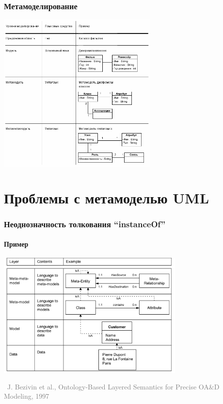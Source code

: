 \documentclass[xetex,mathserif,serif]{beamer}
\newcommand{\attribution}[1] {
\vspace{-5mm}\begin{flushright}\begin{scriptsize}\textcolor{gray}{\textcopyright\, #1}\end{scriptsize}\end{flushright}
}
\begin{document}
	\begin{frame}
		\frametitle{Метамоделирование}
		\begin{center}
			\includegraphics[width=0.6\textwidth]{metalevels.png}
		\end{center}
	\end{frame}

	\section{Проблемы с метамоделью UML}

	\begin{frame}
		\frametitle{Неоднозначность толкования ``instanceOf''}
		\framesubtitle{Пример}
		\begin{center}
			\includegraphics[width=0.7\textwidth]{bezivinExample.png}
			\attribution{J. Bezivin et al., Ontology-Based Layered Semantics for Precise OA\&D Modeling, 1997}
		\end{center}
	\end{frame}
\end{document}
